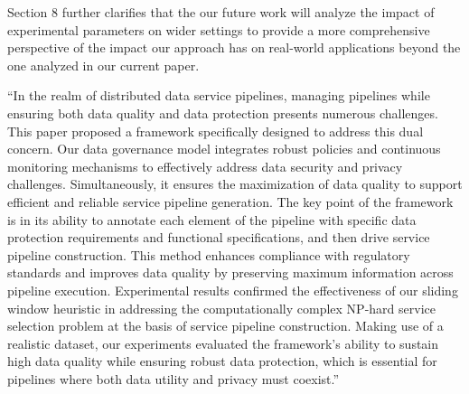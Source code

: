 {    \vspace{0.5em}
    
Section 8 further clarifies that the our future work will analyze the impact of experimental parameters on wider settings to provide a more comprehensive perspective of the impact our approach has on real-world applications beyond the one analyzed in our current paper.

 \begin{adjustwidth}{10pt}{10pt}
        ``{\color{OurColor}In the realm of distributed data service pipelines, managing pipelines while ensuring both data quality and data protection presents numerous challenges. This paper proposed a framework specifically designed to address this dual concern. 
Our data governance model integrates robust policies and continuous monitoring mechanisms to effectively address data security and privacy challenges. Simultaneously, it ensures the maximization of data quality to support efficient and reliable service pipeline generation. The key point of the framework is in its ability to annotate each element of the pipeline with specific data protection requirements and functional specifications, and then drive service pipeline construction. This method enhances compliance with regulatory standards and improves data quality by preserving maximum information across pipeline execution. Experimental results confirmed the effectiveness of our sliding window heuristic in addressing the computationally complex NP-hard service selection problem at the basis of service pipeline construction. Making use of a realistic dataset, our experiments evaluated the framework's ability to sustain high data quality while ensuring robust data protection, which is essential for pipelines where both data utility and privacy must coexist.}''
    \end{adjustwidth}

~}


